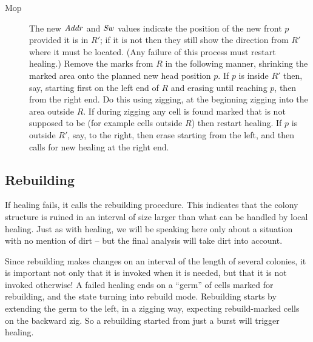 \documentclass[12pt]{memoir}
\newcommand{\fld}[1]{\ensuremath{\textit{#1\/}}}
\newcommand{\R}{R}
\newcommand{\Addr}{\fld{Addr}}
\newcommand{\Sweep}{\fld{Sw}}
\begin{document}
\begin{description}
\item[Mop]
The new \( \Addr \) and \( \Sweep \) values indicate the position of
the new front \( p \) provided it is in \( R' \); if it is
not then they still show the direction from \( R' \) where it must be located.
(Any failure of this process must restart healing.)
Remove the marks from \( \R \) in the following manner, shrinking
the marked area onto the planned new head position \( p \).
If \( p \) is inside \( R' \) then, say, starting
first on the left end of \( \R \) and erasing until reaching \( p \), then from the right end.
Do this using zigging, at the beginning zigging into the area outside \( \R \).
If during zigging any cell is found marked that is not supposed to be 
(for example cells outside \( \R \)) then restart healing.  
If \( p \) is outside \( R' \), say, to the right, then erase starting from the left,
and then calls for new healing at the right end.

\end{description}


\subsection{Rebuilding}\label{sec:rebuilding}

If healing fails, it calls the rebuilding procedure.
This indicates that the colony structure is ruined in an interval of size larger than 
what can be handled by local healing.
Just as with healing, we will be speaking here only about a situation with no 
mention of dirt -- but the final analysis will take dirt into account.

Since rebuilding makes changes on an interval of the length of several colonies,
it is important not only that it is invoked when it is needed, but that it is not
invoked otherwise!
A failed healing ends on a ``germ'' of cells marked for rebuilding,
and the state turning into rebuild mode.
Rebuilding starts by extending the germ to the left, in a zigging way,
expecting rebuild-marked cells on the backward zig.
So a rebuilding started from just a burst will trigger healing.
\end{document}
